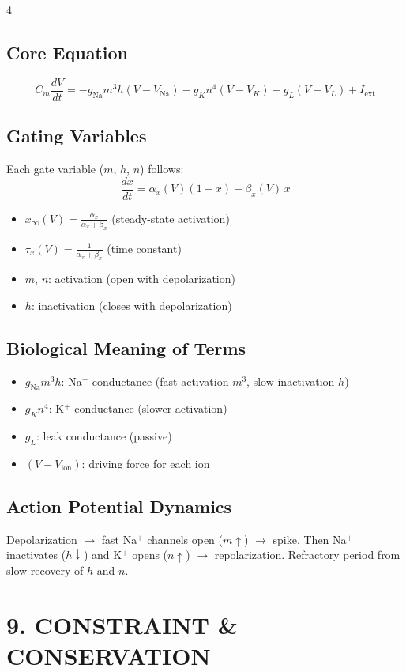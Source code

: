 \documentclass[8pt,landscape]{article}
\begin{document}
\begin{multicols}{4}
\subsection{Core Equation}
\[
C_m \frac{dV}{dt} = -g_{\text{Na}}m^3h(V - V_{\text{Na}}) - g_K n^4(V-V_K) - g_L(V-V_L) + I_{\text{ext}}
\]

\subsection{Gating Variables}
Each gate variable ($m$, $h$, $n$) follows:
\[
\frac{dx}{dt} = \alpha_x(V)(1-x) - \beta_x(V)\,x
\]
\begin{itemize}
  \item $x_\infty(V) = \frac{\alpha_x}{\alpha_x + \beta_x}$ (steady-state activation)
  \item $\tau_x(V) = \frac{1}{\alpha_x + \beta_x}$ (time constant)
  \item $m$, $n$: activation (open with depolarization)
  \item $h$: inactivation (closes with depolarization)
\end{itemize}

\subsection{Biological Meaning of Terms}
\begin{itemize}
  \item $g_{\text{Na}}m^3h$: Na$^+$ conductance (fast activation $m^3$, slow inactivation $h$)
  \item $g_K n^4$: K$^+$ conductance (slower activation)
  \item $g_L$: leak conductance (passive)
  \item $(V - V_{\text{ion}})$: driving force for each ion
\end{itemize}

\subsection{Action Potential Dynamics}
Depolarization $\to$ fast Na$^+$ channels open ($m\uparrow$) $\to$ spike. Then Na$^+$ inactivates ($h\downarrow$) and K$^+$ opens ($n\uparrow$) $\to$ repolarization. Refractory period from slow recovery of $h$ and $n$.

\section{9. CONSTRAINT \& CONSERVATION}


\end{multicols}
\end{document}
